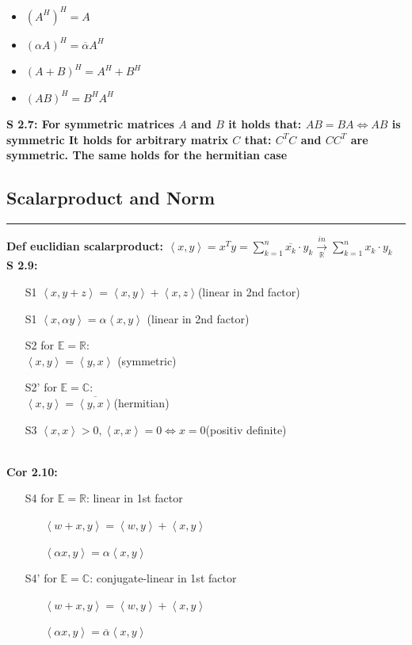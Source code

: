 \documentclass[7pt,landscape, margin = 0.1mm]{article}
\newcommand*{\mysubsection}[1]{\vspace{-2mm}\color{chaptercolor}\subsection{ #1 }
\vspace{-1mm}\hrule\vspace{1.5mm}\color{black}
\vspace{2mm}}
\newcommand{\DEF}[2]{\color{chaptercolor}\bf{Def #1}:\color{black}    \hspace{0.2cm} #2 \\}
\newcommand{\COR}[2]{\color{chaptercolor}\bf{Cor #1}:\color{black}    \hspace{0.2cm} #2 \\}
\newcommand{\SA}[2]{\color{chaptercolor}\bf{S #1}:\color{black}    \hspace{0.2cm} #2 \\}
\begin{document}
\begin{multicols}{4}
\begin{flushleft}
{\begin{itemize}
\item $(A^H)^H=A $
\item $(\alpha A)^H=\overline{\alpha} A^H $
\item $(A+B)^H=A^H+B^H$
\item $ (AB)^H=B^H A^H$
 
\end{itemize}}
\SA{2.7}{For symmetric matrices $A$ and $B$ it holds that: 
$AB=BA \Leftrightarrow AB $ is symmetric
It holds for arbitrary matrix $C$ that:
$C^T C$ and $ CC^T$ are symmetric. The same holds for the hermitian case}
\mysubsection{\centering Scalarproduct and Norm}
\DEF{euclidian scalarproduct}{ $\left< x,y\right> = x^T y = \sum_{k=1}^{n} \overline{x_k} \cdot y_k \xrightarrow[ \mathbb{R}]{in}\sum_{k=1}^{n} x_k \cdot y_k$}
\SA{2.9}{\begin{itemize}

\item[S1] $ \left< x,y+z\right>=\left< x,y\right>+\left< x,z\right> $(linear in 2nd factor)
\item[S1] $ \left< x,\alpha y\right> = \alpha\left< x,y\right>$ (linear in 2nd factor)
\item[S2] for $ \mathbb{E} = \mathbb{R}$:\\$\left< x,y\right>=\left< y,x\right>$ (symmetric)
\item[S2'] for $ \mathbb{E} = \mathbb{C}$:\\$ \left< x,y\right>=\overline{\left< y,x\right>}$(hermitian)
\item[S3] $ \left< x,x\right> > 0, \left< x,x\right>=0\Leftrightarrow x=0$(positiv definite)
 
\end{itemize}}
\COR{2.10}{\begin{itemize}
\item[S4] for $\mathbb{E} = \mathbb{R} $: linear in 1st factor
\begin{itemize}
\item[] $ \left< w+x,y\right>=\left< w,y\right>+\left< x,y\right> $
\item[]  $ \left<\alpha x , y\right> = \alpha\left< x,y\right> $
\end{itemize}
\item[S4'] for $\mathbb{E} = \mathbb{C} $: conjugate-linear in 1st factor 
\begin{itemize}
\item[] $ \left< w+x,y\right>=\left< w,y\right>+\left< x,y\right> $
\item[] $ \left< \alpha x , y\right> = \overline{\alpha}\left< x,y\right> $
\end{itemize}
\end{itemize}}




\end{flushleft}
\end{multicols}
\end{document}
